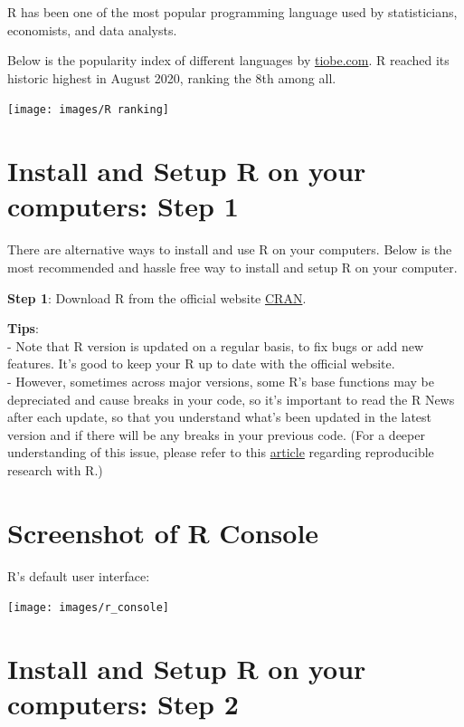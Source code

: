 \documentclass[
  11pt,
]{book}
\begin{document}
R has been one of the most popular programming language used by statisticians, economists, and data analysts.

Below is the popularity index of different languages by \href{https://www.tiobe.com}{tiobe.com}. R reached its historic highest in August 2020, ranking the 8th among all.

\begin{center}\texttt{[image: images/R ranking]} \end{center}

\hypertarget{install-and-setup-r-on-your-computers-step-1}{%
\section{Install and Setup R on your computers: Step 1}\label{install-and-setup-r-on-your-computers-step-1}}

There are alternative ways to install and use R on your computers. Below is the most recommended and hassle free way to install and setup R on your computer.

\textbf{Step 1}: Download R from the official website \href{https://www.r-project.org}{CRAN}.

\textbf{Tips}:\\
- Note that R version is updated on a regular basis, to fix bugs or add new features. It's good to keep your R up to date with the official website.\\
- However, sometimes across major versions, some R's base functions may be depreciated and cause breaks in your code, so it's important to read the R News after each update, so that you understand what's been updated in the latest version and if there will be any breaks in your previous code. (For a deeper understanding of this issue, please refer to this \href{http://datacolada.org/95}{article} regarding reproducible research with R.)

\hypertarget{screenshot-of-r-console}{%
\section{Screenshot of R Console}\label{screenshot-of-r-console}}

R's default user interface:

\begin{center}\texttt{[image: images/r\_console]} \end{center}

\hypertarget{install-and-setup-r-on-your-computers-step-2}{%
\section{Install and Setup R on your computers: Step 2}\label{install-and-setup-r-on-your-computers-step-2}}
\end{document}
